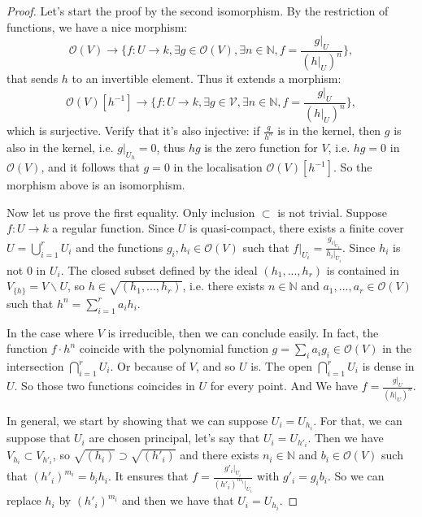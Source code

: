 \documentclass[12pt,a4paper,english]{article}
\theoremstyle{plain}
\theoremstyle{definition}
\theoremstyle{remark}
\begin{document}
\begin{proof}
Let's start the proof by the second isomorphism. By the restriction of functions, we have a nice morphism:
\begin{equation*}
    \mathcal{O}(V)\rightarrow\{f:U\rightarrow k, \exists g\in \mathcal{O}(V),\exists n\in\mathbb{N}, f=\frac{g|_{U}}{(h|_{U})^{n}}\},
\end{equation*}
that sends $h$ to an invertible element. Thus it extends a morphism:
\begin{equation*}
    \mathcal{O}(V)[h^{-1}]\rightarrow \{f:U\rightarrow k ,\exists g\in \mathcal{V}, \exists n\in\mathbb{N}, f=\frac{g|_{U}}{(h|_{U})^{n}}\},
\end{equation*}
which is surjective. Verify that it's also injective: if $\frac{g}{h^{n}}$ is in the kernel, then $g$ is also in the kernel, i.e. $g|_{U_{h}}=0$, thus $hg$ is the zero function for $V$, i.e. $hg=0$ in $\mathcal{O}(V)$, and it follows that $g=0$ in the localisation $\mathcal{O}(V)[h^{-1}]$. So the morphism above is an isomorphism.

Now let us prove the first equality. Only inclusion $\subset$ is not trivial. Suppose $f:U\rightarrow k$ a regular function. Since $U$ is quasi-compact,  there exists a finite cover $U=\bigcup^{r}_{i=1}U_{i}$ and the functions $g_{i}, h_{i}\in\mathcal{O}(V)$ such that $f|_{U_{i}}=\frac{g_{i|_{U_{I}}}}{h_{i}|_{U_{i}}}$. Since $h_{i}$ is not 0 in $U_{i}$. The closed subset defined by the ideal $(h_{1},...,h_{r})$ is contained in $V_{\{h\}}=V\backslash U$, so $h\in\sqrt{(h_{1},...,h_{r})}$, i.e. there exists $n\in\mathbb{N}$ and $a_{1},...,a_{r}\in\mathcal{O}(V)$ such that $h^{n}=\sum^{r}_{i=1}a_{i}h_{i}$.

In the case where $V$ is irreducible, then we can conclude easily. In fact, the function $f\cdot h^{n}$ coincide with the polynomial function $g=\sum_{i}a_{i}g_{i}\in\mathcal{O}(V)$ in the intersection $\bigcap_{i=1}^{r}U_{i}$. Or because of $V$, and so $U$ is. The open $\bigcap^{r}_{i=1}U_{i}$ is dense in $U$. So those two functions coincides in $U$ for every point. And We have $f=\frac{g|_{U}}{(h|_{U})^{n}}$. 

In general, we start by showing that we can suppose $U_{i}=U_{h_{i}}$. For that, we can suppose that $U_{i}$ are chosen principal, let's say that $U_{i}=U_{h'_{i}}$. Then we have $V_{h_{i}}\subset V_{h'_{i}}$, so $\sqrt{(h_{i})}\supset \sqrt{(h'_{i})}$ and there exists $n_{i}\in\mathbb{N}$ and $b_{i}\in\mathcal{O}(V)$ such that $(h'_{i})^{m_{i}}=b_{i}h_{i}$. It ensures that $f=\frac{g'_{i}|_{U_{i}}}{(h'_{i})^{m_{i}}|_{U_{i}}}$ with $g'_{i}= g_{i}b_{i}$. So we can replace $h_{i} $ by $(h'_{i})^{m_{i}}$ and then we have that $U_{i}=U_{h_{i}}$.


\end{proof}
\end{document}
